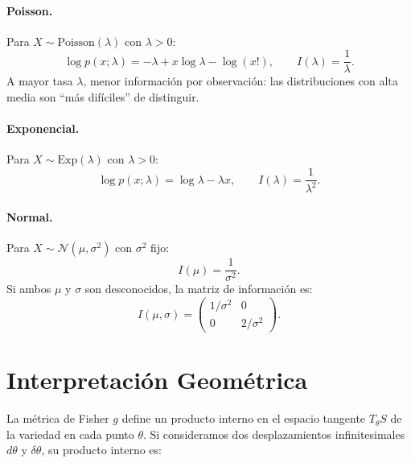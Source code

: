 \paragraph{Poisson.} Para $X \sim \mathrm{Poisson}(\lambda)$ con $\lambda > 0$:
\[
\log p(x;\lambda) = -\lambda + x \log \lambda - \log(x!), \qquad
I(\lambda) = \frac{1}{\lambda}.
\]
A mayor tasa $\lambda$, menor información por observación: las distribuciones con alta media son ``más difíciles'' de distinguir.

\paragraph{Exponencial.} Para $X \sim \mathrm{Exp}(\lambda)$ con $\lambda > 0$:
\[
\log p(x;\lambda) = \log \lambda - \lambda x, \qquad
I(\lambda) = \frac{1}{\lambda^2}.
\]

\paragraph{Normal.} Para $X \sim \mathcal{N}(\mu, \sigma^2)$ con $\sigma^2$ fijo:
\[
I(\mu) = \frac{1}{\sigma^2}.
\]
Si ambos $\mu$ y $\sigma$ son desconocidos, la matriz de información es:
\[
I(\mu, \sigma) = \begin{pmatrix} 1/\sigma^2 & 0 \\ 0 & 2/\sigma^2 \end{pmatrix}.
\]

\begin{center}
\end{center}

\section{Interpretación Geométrica}

La métrica de Fisher $g$ define un producto interno en el espacio tangente $T_\theta S$ de la variedad en cada punto $\theta$. Si consideramos dos desplazamientos infinitesimales $d\theta$ y $\delta\theta$, su producto interno es:

